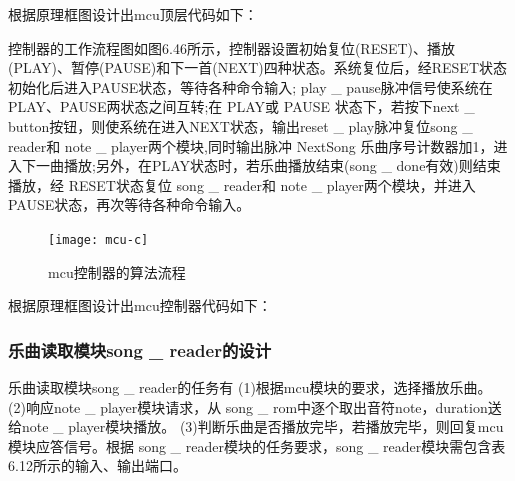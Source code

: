 \documentclass{../source/Experiment}
\begin{document}
                根据原理框图设计出mcu顶层代码如下：
                

                控制器的工作流程图如图6.46所示，控制器设置初始复位(RESET)、播放(PLAY)、暂停(PAUSE)和下一首(NEXT)四种状态。系统复位后，经RESET状态初始化后进入PAUSE状态，等待各种命令输入; play \_ pause脉冲信号使系统在 PLAY、PAUSE两状态之间互转;在 PLAY或 PAUSE 状态下，若按下next \_ button按钮，则使系统在进入NEXT状态，输出reset \_  play脉冲复位song  \_ reader和 note \_ player两个模块,同时输出脉冲 NextSong 乐曲序号计数器加1，进入下一曲播放;另外，在PLAY状态时，若乐曲播放结束(song \_ done有效)则结束播放，经 RESET状态复位 song \_ reader和 note \_ player两个模块，并进入 PAUSE状态，再次等待各种命令输入。

                \begin{figure}[H]
                    \centering
                    \texttt{[image: mcu-c]}
                    \caption{mcu控制器的算法流程}
                \end{figure}

                根据原理框图设计出mcu控制器代码如下：
                

            \subsubsection{乐曲读取模块song \_ reader的设计}

                乐曲读取模块song \_ reader的任务有
                (1)根据mcu模块的要求，选择播放乐曲。
                (2)响应note \_ player模块请求，从 song \_ rom中逐个取出音符{note，duration}送给note \_ player模块播放。
                (3)判断乐曲是否播放完毕，若播放完毕，则回复mcu模块应答信号。根据 song \_ reader模块的任务要求，song \_ reader模块需包含表6.12所示的输入、输出端口。
\end{document}
